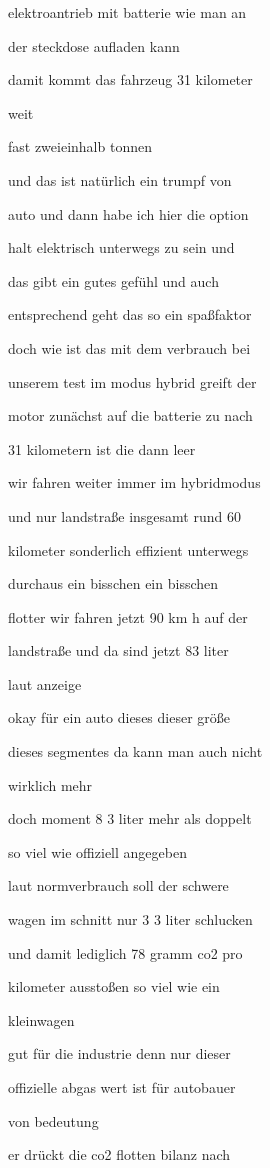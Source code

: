 \documentclass[a4paper, 11pt]{book} %
\begin{document}
elektroantrieb mit batterie wie man an

der steckdose aufladen kann

damit kommt das fahrzeug 31 kilometer

weit

fast zweieinhalb tonnen

und das ist natürlich ein trumpf von

auto und dann habe ich hier die option

halt elektrisch unterwegs zu sein und

das gibt ein gutes gefühl und auch

entsprechend geht das so ein spaßfaktor

doch wie ist das mit dem verbrauch bei

unserem test im modus hybrid greift der

motor zunächst auf die batterie zu nach

31 kilometern ist die dann leer

wir fahren weiter immer im hybridmodus

und nur landstraße insgesamt rund 60

kilometer sonderlich effizient unterwegs

durchaus ein bisschen ein bisschen

flotter wir fahren jetzt 90 km h auf der

landstraße und da sind jetzt 83 liter

laut anzeige

okay für ein auto dieses dieser größe

dieses segmentes da kann man auch nicht

wirklich mehr

doch moment 8 3 liter mehr als doppelt

so viel wie offiziell angegeben

laut normverbrauch soll der schwere

wagen im schnitt nur 3 3 liter schlucken

und damit lediglich 78 gramm co2 pro

kilometer ausstoßen so viel wie ein

kleinwagen

gut für die industrie denn nur dieser

offizielle abgas wert ist für autobauer

von bedeutung

er drückt die co2 flotten bilanz nach
\end{document}
